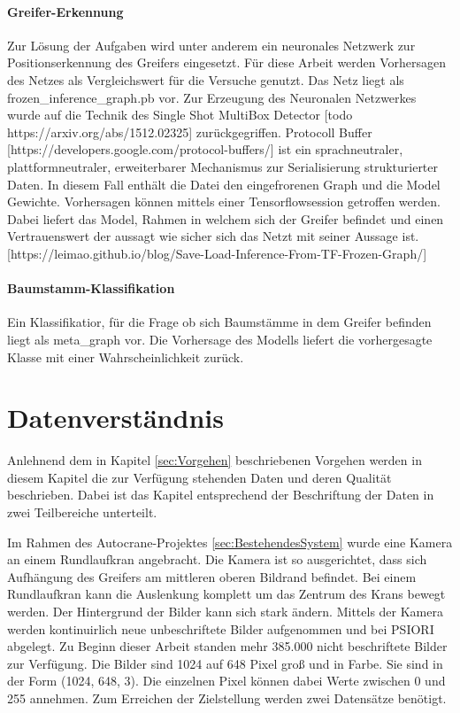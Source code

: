 	\paragraph{Greifer-Erkennung} 
Zur Lösung der Aufgaben wird unter anderem ein neuronales Netzwerk zur Positionserkennung des Greifers eingesetzt. Für diese Arbeit werden Vorhersagen des Netzes als Vergleichswert für die Versuche genutzt. Das Netz liegt als frozen\_inference\_graph.pb vor. Zur Erzeugung des Neuronalen Netzwerkes wurde auf die Technik des Single Shot MultiBox Detector [todo https://arxiv.org/abs/1512.02325] zurückgegriffen.
 Protocoll Buffer  [https://developers.google.com/protocol-buffers/] ist ein sprachneutraler, plattformneutraler, erweiterbarer Mechanismus zur Serialisierung strukturierter Daten. In diesem Fall enthält die Datei den eingefrorenen Graph und die Model Gewichte. Vorhersagen können mittels einer Tensorflowsession getroffen werden. Dabei liefert das Model, Rahmen in welchem sich der Greifer befindet und einen Vertrauenswert der aussagt wie sicher sich das Netzt mit seiner Aussage ist.	[https://leimao.github.io/blog/Save-Load-Inference-From-TF-Frozen-Graph/]
		
	\paragraph{Baumstamm-Klassifikation} 
	Ein Klassifikatior, für die Frage ob sich Baumstämme in dem Greifer befinden liegt als meta\_graph vor. Die Vorhersage des Modells liefert die vorhergesagte Klasse mit einer Wahrscheinlichkeit zurück.

	\section{Datenverständnis}
	\label{sec:DataUnderstanding}
	Anlehnend dem in Kapitel \ref{sec:Vorgehen} beschriebenen Vorgehen  werden in diesem Kapitel die zur Verfügung stehenden Daten und deren Qualität beschrieben. Dabei ist das Kapitel entsprechend der Beschriftung der Daten in zwei Teilbereiche unterteilt.
	
	Im Rahmen des Autocrane-Projektes \ref{sec:BestehendesSystem}  wurde eine Kamera an einem Rundlaufkran angebracht. Die Kamera ist so ausgerichtet, dass sich Aufhängung des Greifers am mittleren oberen Bildrand befindet. Bei einem Rundlaufkran kann die Auslenkung komplett um das Zentrum des Krans bewegt werden. Der Hintergrund der Bilder kann sich stark ändern. Mittels der Kamera werden kontinuirlich neue unbeschriftete Bilder aufgenommen und bei PSIORI abgelegt. Zu Beginn dieser Arbeit standen mehr 385.000 nicht beschriftete Bilder zur Verfügung. Die Bilder sind 1024 auf 648 Pixel groß und in Farbe. Sie sind in der Form (1024, 648, 3). Die einzelnen Pixel können dabei Werte zwischen 0 und 255 annehmen. 
	Zum Erreichen der Zielstellung werden zwei Datensätze benötigt.
	
